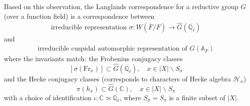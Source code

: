 Based on this observation, the Langlands correspondence for a reductive group $G$ (over a function field) 
is a correspondence between
\begin{align*}
    \boxed{
        \text{irreducible representation } \sigma:W(\overline{F}/F) \to \widehat{G}(\overline{\mathbb{Q}_{\ell}})
    }
\end{align*}
and
\begin{align*}
    \boxed{
        \text{irreducible cuspidal automorphic representation of }G(\mathbb{A}_F)
    }
\end{align*}
where the invariants match: the Frobenius conjugacy classes 
$$
[\sigma(\mathrm{Fr}_{x})] \subset \widehat{G}(\overline{\mathbb{Q}_{\ell}}), \quad x \in |X| \backslash S_{\sigma}
$$
and the Hecke conjugacy classes (corresponds to characters of Hecke algebra $\mathcal{H}_x$)
$$
\pi(h_x) \subset \widehat{G}(\mathbb{C}),\quad x \in |X| \backslash S_\pi
$$
with a choice of identification $\iota: \mathbb{C} \simeq \overline{\mathbb{Q}_{\ell}}$, where $S_\sigma = S_\pi$ is a finite subset of $|X|$.